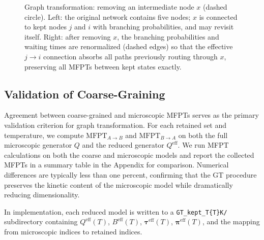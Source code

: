 \begin{figure}[ht]
  \caption{Graph transformation: removing an intermediate node $x$ (dashed circle). Left: the original network contains five nodes; $x$ is connected to kept nodes $j$ and $i$ with branching probabilities, and may revisit itself. Right: after removing $x$, the branching probabilities and waiting times are renormalized (dashed edges) so that the effective $j \to i$ connection absorbs all paths previously routing through $x$, preserving all MFPTs between kept states exactly.}
  \label{fig:graph-transformation}
\end{figure}


\subsection{Validation of Coarse-Graining}\label{subsec:gt-validation}

Agreement between coarse-grained and microscopic MFPTs serves as the primary validation
criterion for graph transformation. For each retained set and temperature, we compute
$\mathrm{MFPT}_{A \to B}$ and $\mathrm{MFPT}_{B \to A}$ on both the full microscopic
generator $Q$ and the reduced generator $Q^{\mathrm{eff}}$. We run MFPT calculations
on both the coarse and microscopic models and report the collected MFPTs in a summary
table in the Appendix for comparison. Numerical differences are typically less than one
percent, confirming that the GT procedure preserves the kinetic content of the
microscopic model while dramatically reducing dimensionality.

In implementation, each reduced model is written to a
\texttt{GT\_kept\_T\{T\}K/} subdirectory containing $Q^{\mathrm{eff}}(T)$,
$B^{\mathrm{eff}}(T)$, $\boldsymbol{\tau}^{\mathrm{eff}}(T)$,
$\boldsymbol{\pi}^{\mathrm{eff}}(T)$, and the mapping from microscopic indices to
retained indices.


